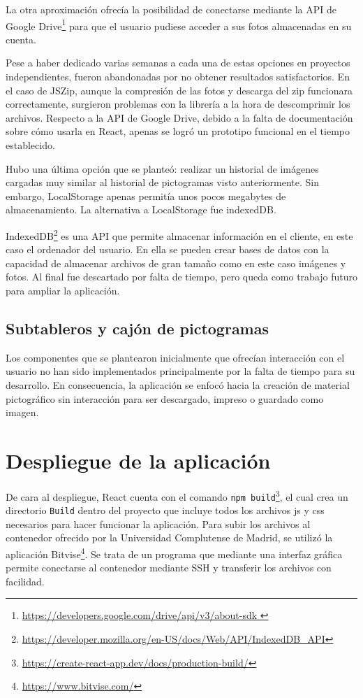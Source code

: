 La otra aproximación ofrecía la posibilidad de conectarse mediante la API de Google Drive\footnote{\url{https://developers.google.com/drive/api/v3/about-sdk }} para que el usuario pudiese acceder a sus fotos almacenadas en su cuenta. 

Pese a haber dedicado varias semanas a cada una de estas opciones en proyectos independientes, fueron abandonadas por no obtener resultados satisfactorios. En el caso de JSZip, aunque la compresión de las fotos y descarga del zip funcionara correctamente, surgieron problemas con la librería a la hora de descomprimir los archivos. Respecto a la API de Google Drive, debido a la falta de documentación sobre cómo usarla en React, apenas se logró un prototipo funcional en el tiempo establecido. 

Hubo una última opción que se planteó: realizar un historial de imágenes cargadas muy similar al historial de pictogramas visto anteriormente. Sin embargo, LocalStorage apenas permitía unos pocos megabytes de almacenamiento. La alternativa a LocalStorage fue indexedDB. 

IndexedDB\footnote{\url{https://developer.mozilla.org/en-US/docs/Web/API/IndexedDB_API}}   es una API que permite almacenar información en el cliente, en este caso el ordenador del usuario. En ella se pueden crear bases de datos con la capacidad de almacenar archivos de gran tamaño como en este caso imágenes y fotos. Al final fue descartado por falta de tiempo, pero queda como trabajo futuro para ampliar la aplicación.


\subsection{Subtableros y cajón de pictogramas}

Los componentes que se plantearon inicialmente que ofrecían interacción con el usuario no han sido implementados principalmente por la falta de tiempo para su desarrollo. En consecuencia, la aplicación se enfocó hacia la creación de material pictográfico sin interacción para ser descargado, impreso o guardado como imagen. 

\section{Despliegue de la aplicación}

De cara al despliegue, React cuenta con el comando \texttt{npm build}\footnote{\url{https://create-react-app.dev/docs/production-build/}}, el cual crea un directorio \texttt{Build} dentro del proyecto que incluye todos los archivos js y css necesarios para hacer funcionar la aplicación. Para subir los archivos al contenedor ofrecido por la Universidad Complutense de Madrid, se utilizó la aplicación Bitvise\footnote{\url{https://www.bitvise.com/}}. Se trata de un programa que mediante una interfaz gráfica permite conectarse al contenedor mediante SSH y transferir los archivos con facilidad. 


